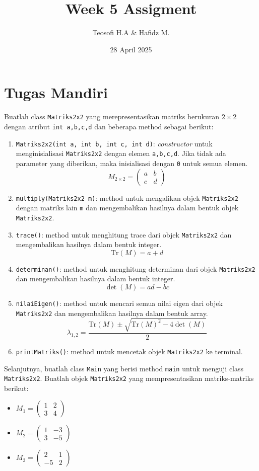 \documentclass{article}
\title{\textbf{Week 5 Assigment}}
\date{28 April 2025}
\author{Teosofi H.A \& Hafidz M.}
\begin{document}
  \maketitle
  \section*{Tugas Mandiri}
  Buatlah class \texttt{Matriks2x2} yang merepresentasikan matriks berukuran $2\times 2$ dengan atribut \texttt{int a,b,c,d} dan beberapa method sebagai berikut:
  \begin{enumerate}
    \item \texttt{\color{blue}Matriks2x2(int a, int b, int c, int d)}: \textit{constructor} untuk menginisialisasi \texttt{Matriks2x2} dengan elemen \texttt{a,b,c,d}. Jika tidak ada parameter yang diberikan, maka inisialisasi dengan \texttt{0} untuk semua elemen.
    \[M_{2\times 2}=\begin{pmatrix} a & b \\ c & d \end{pmatrix}\]
    \item \texttt{\color{blue}multiply(Matriks2x2 m)}: method untuk mengalikan objek \texttt{Matriks2x2} dengan matriks lain \texttt{m} dan mengembalikan hasilnya dalam bentuk objek \texttt{Matriks2x2}.
    \item \texttt{\color{blue}trace()}: method untuk menghitung trace dari objek \texttt{Matriks2x2} dan mengembalikan hasilnya dalam bentuk integer.
    \[\text{Tr}(M)= a+d\]
    \item \texttt{\color{blue}determinan()}: method untuk menghitung determinan dari objek \texttt{Matriks2x2} dan mengembalikan hasilnya dalam bentuk integer.
    \[\det(M)= ad-bc\]
    \item \texttt{\color{blue}nilaiEigen()}: method untuk mencari semua nilai eigen dari objek \texttt{Matriks2x2} dan mengembalikan hasilnya dalam bentuk array.
    \[\lambda_{1,2}=\frac{\text{Tr}(M)\pm\sqrt{\text{Tr}(M)^2-4\det(M)}}{2}\]
    \item \texttt{\color{blue}printMatriks()}: method untuk mencetak objek \texttt{Matriks2x2} ke terminal.
  \end{enumerate}
  Selanjutnya, buatlah class \texttt{\color{red}Main} yang berisi method \texttt{main} untuk menguji class \texttt{Matriks2x2}. Buatlah objek \texttt{Matriks2x2} yang mempresentasikan matriks-matriks berikut:
  \begin{multicols}{3}
    \begin{itemize}
      \item $M_{1}=\begin{pmatrix} 1 & 2 \\ 3 & 4 \end{pmatrix}$
      \item $M_{2}=\begin{pmatrix} 1 & -3 \\ 3 & -5 \end{pmatrix}$
      \item $M_{3}=\begin{pmatrix} 2 & 1 \\ -5 & 2 \end{pmatrix}$
    \end{itemize}
  \end{multicols}
\end{document}
